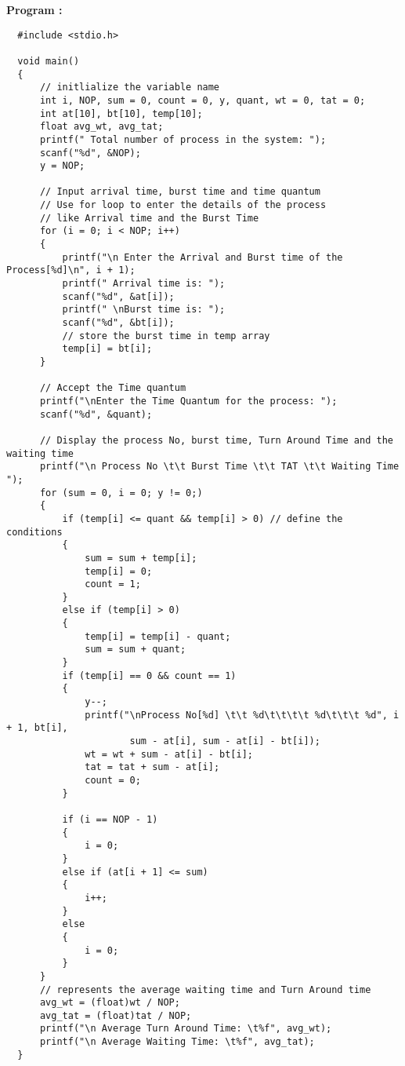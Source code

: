 \documentclass[journal,onecolumn]{IEEEtran}
\begin{document}
\textbf{Program : }
\begin{verbatim}
  #include <stdio.h>

  void main()
  {
      // initlialize the variable name
      int i, NOP, sum = 0, count = 0, y, quant, wt = 0, tat = 0;
      int at[10], bt[10], temp[10];
      float avg_wt, avg_tat;
      printf(" Total number of process in the system: ");
      scanf("%d", &NOP);
      y = NOP; 
  
      // Input arrival time, burst time and time quantum
      // Use for loop to enter the details of the process 
      // like Arrival time and the Burst Time
      for (i = 0; i < NOP; i++)
      {
          printf("\n Enter the Arrival and Burst time of the Process[%d]\n", i + 1);
          printf(" Arrival time is: "); 
          scanf("%d", &at[i]);
          printf(" \nBurst time is: "); 
          scanf("%d", &bt[i]);
          // store the burst time in temp array
          temp[i] = bt[i]; 
      }
  
      // Accept the Time quantum
      printf("\nEnter the Time Quantum for the process: ");
      scanf("%d", &quant);
      
      // Display the process No, burst time, Turn Around Time and the waiting time
      printf("\n Process No \t\t Burst Time \t\t TAT \t\t Waiting Time ");
      for (sum = 0, i = 0; y != 0;)
      {
          if (temp[i] <= quant && temp[i] > 0) // define the conditions
          {
              sum = sum + temp[i];
              temp[i] = 0;
              count = 1;
          }
          else if (temp[i] > 0)
          {
              temp[i] = temp[i] - quant;
              sum = sum + quant;
          }
          if (temp[i] == 0 && count == 1)
          {
              y--; 
              printf("\nProcess No[%d] \t\t %d\t\t\t\t %d\t\t\t %d", i + 1, bt[i], 
                      sum - at[i], sum - at[i] - bt[i]);
              wt = wt + sum - at[i] - bt[i];
              tat = tat + sum - at[i];
              count = 0;
          }
  
          if (i == NOP - 1)
          {
              i = 0;
          }
          else if (at[i + 1] <= sum)
          {
              i++;
          }
          else
          {
              i = 0;
          }
      }
      // represents the average waiting time and Turn Around time
      avg_wt = (float)wt / NOP;
      avg_tat = (float)tat / NOP;
      printf("\n Average Turn Around Time: \t%f", avg_wt);
      printf("\n Average Waiting Time: \t%f", avg_tat);
  }
\end{verbatim}
\end{document}
